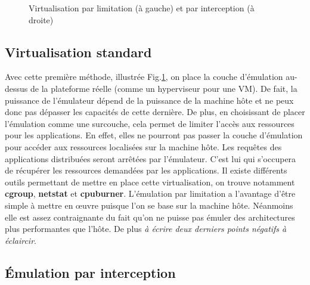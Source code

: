 \begin{figure}[H]
\begin{subfigure}{0.3\textwidth}
  \end{subfigure}
  \caption{Virtualisation par limitation (à gauche) et par interception (à
    droite)}
  \label{TYPE_VIRTUALISATION}
\end{figure}

\subsection{Virtualisation standard}
\label{section:limitation}

Avec cette première méthode, illustrée Fig.\ref{TYPE_VIRTUALISATION}, on place la couche d'émulation au-dessus de la
plateforme réelle (comme un hyperviseur pour une VM). De fait, la puissance de
l'émulateur dépend de la puissance de la machine hôte et ne peux donc pas
dépasser les capacités de cette dernière. De plus, en choisissant de placer
l'émulation comme une surcouche, cela permet de limiter l'accès aux ressources
pour les applications. En effet, elles ne pourront pas passer la couche
d'émulation pour accéder aux ressources localisées sur la machine hôte. Les
requêtes des applications distribuées seront arrêtées par l'émulateur. C'est lui
qui s'occupera de récupérer les ressources demandées par les applications. Il
existe différents outils permettant de mettre en place cette virtualisation, on
trouve notamment \textbf{cgroup}, \textbf{netstat} et \textbf{cpuburner}.  L'émulation par limitation a l'avantage d'être simple à mettre en \oe uvre puisque
l'on se base sur la machine hôte. Néanmoins elle est assez contraignante du fait
qu'on ne puisse pas émuler des architectures plus performantes que l'hôte. De
plus {\color{red} \textit{à écrire deux derniers points négatifs à éclaircir}}.

\subsection{Émulation par interception}

